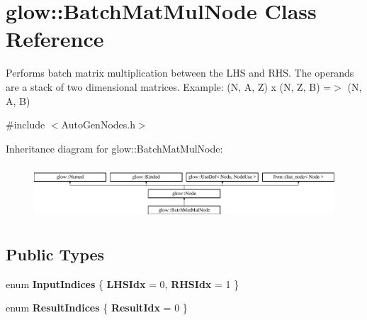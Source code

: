 \hypertarget{classglow_1_1_batch_mat_mul_node}{}\section{glow\+:\+:Batch\+Mat\+Mul\+Node Class Reference}
\label{classglow_1_1_batch_mat_mul_node}


Performs batch matrix multiplication between the L\+HS and R\+HS. The operands are a stack of two dimensional matrices. Example\+: (N, A, Z) x (N, Z, B) =$>$ (N, A, B)  




{\ttfamily \#include $<$Auto\+Gen\+Nodes.\+h$>$}

Inheritance diagram for glow\+:\+:Batch\+Mat\+Mul\+Node\+:\begin{figure}[H]
\begin{center}
\leavevmode
\includegraphics[height=2.028986cm]{classglow_1_1_batch_mat_mul_node}
\end{center}
\end{figure}
\subsection*{Public Types}
\begin{DoxyCompactItemize}
\item 
\mbox{\label{classglow_1_1_batch_mat_mul_node_a6e480d8deae1d5fb9bb08678906f9663}} 
enum {\bfseries Input\+Indices} \{ {\bfseries L\+H\+S\+Idx} = 0, 
{\bfseries R\+H\+S\+Idx} = 1
 \}
\item 
\mbox{\label{classglow_1_1_batch_mat_mul_node_a43e96233e88bf29d5a0b0b9b736f0a41}} 
enum {\bfseries Result\+Indices} \{ {\bfseries Result\+Idx} = 0
 \}
\end{DoxyCompactItemize}
